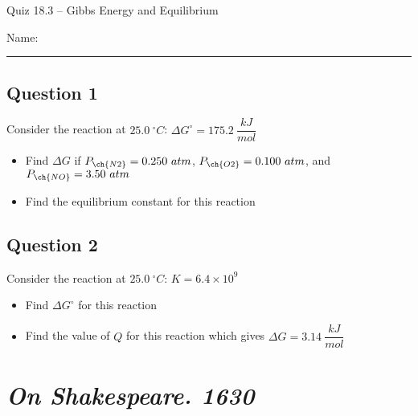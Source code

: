 \documentclass[11pt, letterpaper]{memoir}
\begin{document}
	\begin{center}
		{\large	Quiz 18.3 -- Gibbs Energy and Equilibrium}
	\end{center}
	{\large Name: \rule[-1mm]{4in}{.1pt} 

\subsection*{Question 1}
Consider the reaction at $25.0~^\circ C$:  \hspace{1em} $\Delta G^{\circ} = 175.2~\dfrac{kJ}{mol}$

\begin{itemize}
	\item Find $\Delta G$ if $P_{\ch{N2}} = 0.250~atm$, $P_{\ch{O2}} = 0.100~atm$, and $P_{\ch{NO}} = 3.50~atm$
	
	\vspace{8em}
	\item Find the equilibrium constant for this reaction
\end{itemize}

\vspace{7em}
\subsection*{Question 2}
Consider the reaction at $25.0~^\circ C$:  \hspace{1em} $K=6.4\times10^9$

\begin{itemize}
	\item Find $\Delta G^{\circ}$ for this reaction
	
	\vspace{8em}
	\item Find the value of $Q$ for this reaction which gives $\Delta G = 3.14~\dfrac{kJ}{mol}$
\end{itemize}

	\newpage
	\pagestyle{empty}
	\addtocounter{page}{-1}
\section*{\emph{On Shakespeare. 1630}}
}
\end{document}
